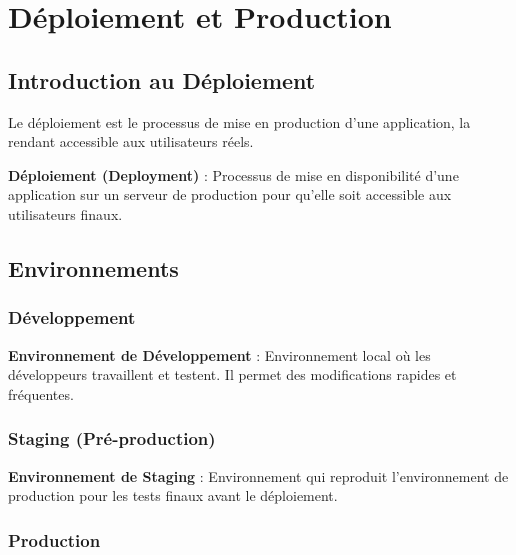 \chapter{Déploiement et Production}

\section{Introduction au Déploiement}

Le déploiement est le processus de mise en production d'une application, la rendant accessible aux utilisateurs réels.

\begin{definitionbox}
    \textbf{Déploiement (Deployment)} : Processus de mise en disponibilité d'une application sur un serveur de production pour qu'elle soit accessible aux utilisateurs finaux.
\end{definitionbox}

\section{Environnements}

\subsection{Développement}

\begin{definitionbox}
    \textbf{Environnement de Développement} : Environnement local où les développeurs travaillent et testent. Il permet des modifications rapides et fréquentes.
\end{definitionbox}

\subsection{Staging (Pré-production)}

\begin{definitionbox}
    \textbf{Environnement de Staging} : Environnement qui reproduit l'environnement de production pour les tests finaux avant le déploiement.
\end{definitionbox}

\subsection{Production}

